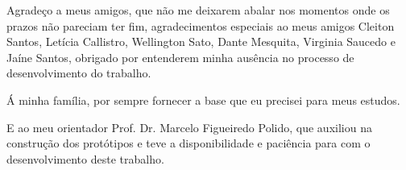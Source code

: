 \begin{agradecimentos}

Agradeço a meus amigos, que não me deixarem abalar nos momentos onde os prazos não pareciam ter fim, agradecimentos especiais ao meus amigos Cleiton Santos, Letícia Callistro, Wellington Sato, Dante Mesquita, Virginia Saucedo e Jaíne Santos, obrigado por entenderem minha ausência no processo de desenvolvimento do trabalho.

Á minha família, por sempre fornecer a base que eu precisei para meus estudos.

E ao meu orientador Prof. Dr. Marcelo Figueiredo Polido, que auxiliou na construção dos protótipos e teve a disponibilidade e paciência para com o desenvolvimento deste trabalho.

\end{agradecimentos}
